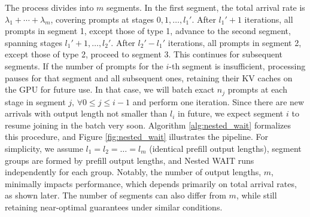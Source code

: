 The process divides into \( m \) segments. In the first segment, the total arrival rate is \( \lambda_1 + \cdots + \lambda_m \), covering prompts at stages \( 0, 1, \dots, l_1' \). After \( l_1' + 1 \) iterations, all prompts in segment 1, except those of type 1, advance to the second segment, spanning stages \( l_1' + 1, \dots, l_2' \). After \( l_2' - l_1' \) iterations, all prompts in segment 2, except those of type 2, proceed to segment 3. This continues for subsequent segments. If the number of prompts for the \( i \)-th segment is insufficient, processing pauses for that segment and all subsequent ones, retaining their KV caches on the GPU for future use. In that case, we will batch exact $n_j$ prompts at each stage in segment $j,\,\forall 0\le j\le i-1$ and perform one iteration. Since there are new arrivals with output length not smaller than $l_i$ in future, we expect segment $i$ to resume joining in the batch very soon. Algorithm \ref{alg:nested_wait} formalizes this procedure, and Figure \ref{fig:nested_wait} illustrates the pipeline. For simplicity, we assume \( l_1 = l_2 = \dots = l_m \) (identical prefill output lengths), segment groups are formed by prefill output lengths, and Nested WAIT runs independently for each group. Notably, the number of output lengths, \( m \), minimally impacts performance, which depends primarily on total arrival rates, as shown later. The number of segments can also differ from \( m \), while still retaining near-optimal guarantees under similar conditions. 

